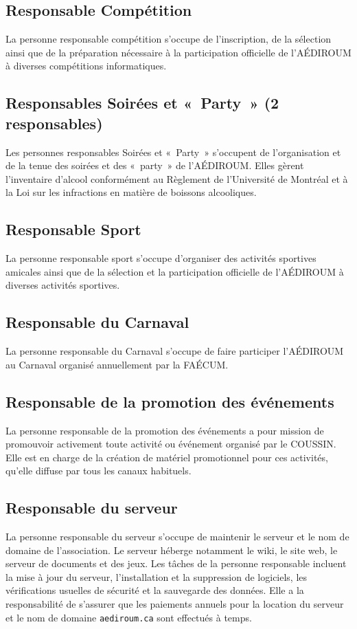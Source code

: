 \documentclass{aediroum}
\begin{document}
\subsection{Responsable Compétition}
La personne responsable compétition s'occupe de l'inscription, de la sélection ainsi que de la préparation nécessaire à la participation officielle de l'AÉDIROUM à diverses compétitions informatiques.

\subsection{Responsables Soirées et «~Party~» (2 responsables)}
Les personnes responsables Soirées et «~Party~» s'occupent de l'organisation et de la tenue des soirées et des «~party~» de l'AÉDIROUM. Elles gèrent l'inventaire d'alcool conformément au Règlement de l'Université de Montréal et à la Loi sur les infractions en matière de boissons alcooliques.

\subsection{Responsable Sport}
La personne responsable sport s'occupe d'organiser des activités sportives amicales ainsi que de la sélection et la participation officielle de l'AÉDIROUM à diverses activités sportives.

\subsection{Responsable du Carnaval}
La personne responsable du Carnaval s'occupe de faire participer l'AÉDIROUM au Carnaval organisé annuellement par la FAÉCUM.

\subsection{Responsable de la promotion des événements}
La personne responsable de la promotion des événements a pour mission de promouvoir activement toute activité ou événement organisé par le COUSSIN. Elle est en charge de la création de matériel promotionnel pour ces activités, qu’elle diffuse par tous les canaux habituels.

\subsection{Responsable du serveur}
La personne responsable du serveur s’occupe de maintenir le serveur et le nom de domaine de l’association. Le serveur héberge notamment le wiki, le site web, le serveur de documents et des jeux. Les tâches de la personne responsable incluent la mise à jour du serveur, l’installation et la suppression de logiciels, les vérifications usuelles de sécurité et la sauvegarde des données. Elle a la responsabilité de s’assurer que les paiements annuels pour la location du serveur et le nom de domaine \texttt{aediroum.ca} sont effectués à temps.
\end{document}
